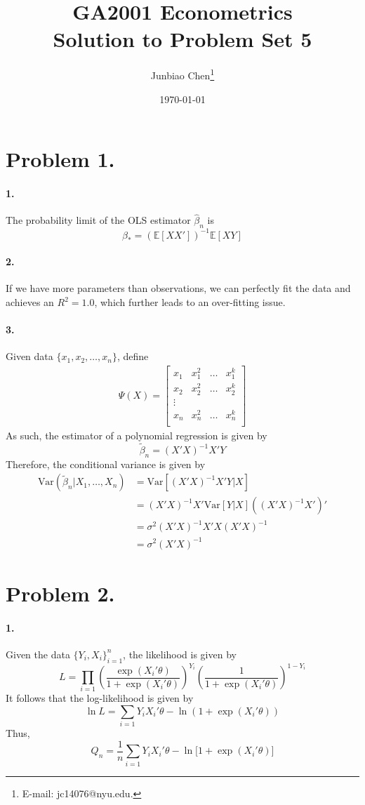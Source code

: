\documentclass[11pt]{article}
\title{GA2001 Econometrics \\Solution to Problem Set 5}
\author{
Junbiao Chen\thanks{E-mail: jc14076@nyu.edu.}
}
\date{\today}
\theoremstyle{definition}
\theoremstyle{boldtitle} %
\numberwithin{equation}{section}
\numberwithin{figure}{section}
\numberwithin{table}{section}
\begin{document}
\maketitle
\section*{Problem 1.}
\paragraph{1.}
The probability limit of the OLS estimator $\hat{\beta}_n$ is 
\[
\beta_* = \left(\mathbb{E}[XX']\right)^{-1}\mathbb{E}[XY]
\]

\paragraph{2.}
If we have more parameters than observations,
we can perfectly fit the data and achieves an $R^2=1.0$,
which further leads to an over-fitting issue.

\paragraph{3.}
Given data $\{x_1, x_2, \dots, x_n \}$,
define 
\begin{align*}
\Psi(X) = \begin{bmatrix}
    x_1 & x_1^2 & \dots & x_1^k \\ 
    x_2 & x_2^2 & \dots & x_2^k \\ 
    \vdots \\
    x_n & x_n^2 & \dots & x_n^k \\ 
\end{bmatrix}
\end{align*}
As such, the estimator of a polynomial regression is given by 
\[
\tilde{\beta}_n = \left( X'X\right)^{-1}X'Y
\]
Therefore, the conditional variance is given by 
\begin{align*}
\text{Var}\left(\tilde{\beta}_n |X_1, \dots, X_n \right) & = \text{Var}[\left( X'X\right)^{-1}X'Y|X] \\ 
 & = \left( X'X\right)^{-1}X' \text{Var}[Y|X] (\left( X'X\right)^{-1}X')' \\ 
 & = \sigma^2  \left( X'X\right)^{-1}X'X \left( X'X\right)^{-1} \\
 & = \sigma^2  \left( X'X\right)^{-1}
\end{align*}

\section*{Problem 2.}
\paragraph{1.} Given the data $\{Y_i, X_i\}_{i=1}^n$, the likelihood is given by 
\[
L = \prod_{i=1} \left(
    \frac{\exp (X_i'\theta)}{1 + \exp (X_i'\theta)}
\right)^{Y_i} 
\left(
    \frac{1}{1 + \exp (X_i'\theta)}
\right)^{1 - Y_i} 
\]
It follows that the log-likelihood is given by 
\[
\ln L = \sum_{i=1} Y_i X_i'\theta - \ln(1 + \exp (X_i'\theta))
\]
Thus, 
\[
Q_n = \frac{1}{n} \sum_{i=1} Y_i X_i'\theta - \ln\bigg[1 + \exp (X_i'\theta)\bigg]
\]



\end{document}
